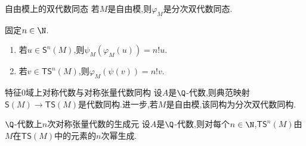 \begin{proposition}{自由模上的双代数同态}{}
	若$M$是自由模,则$\varphi_{M}$是分次双代数同态.
\end{proposition}

\begin{proposition}{}{}
	固定$n\in\N$.
	\begin{enumerate}
		\item 若$u\in\mathsf{S}^{n}\left(M\right)$,则$\psi_{M}\left(\varphi_{M}\left(u\right)\right)=n!u$.
		\item 若$v\in\mathsf{TS}^{n}\left(M\right)$,则$\varphi_{M}\left(\psi\left(v\right)\right)=n!v$.
	\end{enumerate}
\end{proposition}

\begin{corollary}{特征$0$域上对称代数与对称张量代数同构}{}
	设$A$是$\Q$-代数,则典范映射$\mathsf{S}\left(M\right)\to\mathsf{TS}\left(M\right)$是代数同构.进一步,若$M$是自由模,该同构为分次双代数同构.
\end{corollary}

\begin{corollary}{$\Q$-代数上$n$次对称张量代数的生成元}{}
	设$A$是$\Q$-代数,则对每个$n\in\N$,$\mathsf{TS}^{n}\left(M\right)$由$M$在$\mathsf{TS}\left(M\right)$中的元素的$n$次幂生成.
\end{corollary}








































